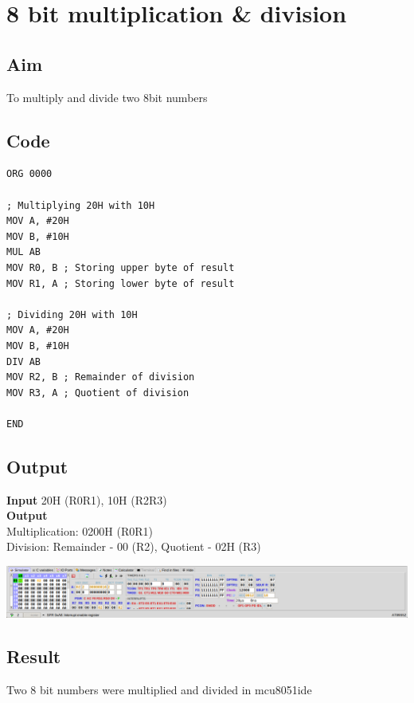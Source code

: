\section{8 bit multiplication \& division}
\subsection{Aim}
To multiply and divide two 8bit numbers

\subsection{Code}
\begin{lstlisting}
ORG 0000

; Multiplying 20H with 10H
MOV A, #20H
MOV B, #10H
MUL AB
MOV R0, B ; Storing upper byte of result
MOV R1, A ; Storing lower byte of result

; Dividing 20H with 10H
MOV A, #20H
MOV B, #10H
DIV AB
MOV R2, B ; Remainder of division
MOV R3, A ; Quotient of division	

END
\end{lstlisting}

\subsection{Output}
\textbf{Input} 20H (R0R1), 10H (R2R3)\\
\textbf{Output}\\
Multiplication: 0200H (R0R1)\\
Division: Remainder - 00 (R2), Quotient - 02H (R3)
\begin{center}
	\includegraphics[width=\textwidth]{img/p23.png}
\end{center}

\subsection{Result}
Two 8 bit numbers were multiplied and divided in mcu8051ide